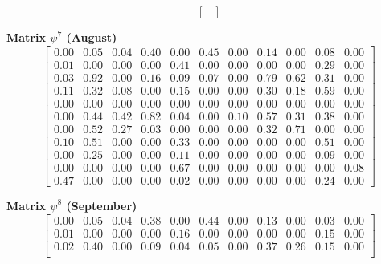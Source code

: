 \documentclass[a4paper,fleqn]{cas-dc}
\begin{document}
\begin{scriptsize}
\[\begin{bmatrix}
\end{bmatrix}
\]

\textbf{Matrix $\psi^{7}$ (August)}
\[
\begin{bmatrix}

0.00 & 0.05 & 0.04 & 0.40 & 0.00 & 0.45 & 0.00 & 0.14 & 0.00 & 0.08 & 0.00\\

0.01 & 0.00 & 0.00 & 0.00 & 0.41 & 0.00 & 0.00 & 0.00 & 0.00 & 0.29 & 0.00\\

0.03 & 0.92 & 0.00 & 0.16 & 0.09 & 0.07 & 0.00 & 0.79 & 0.62 & 0.31 & 0.00\\

0.11 & 0.32 & 0.08 & 0.00 & 0.15 & 0.00 & 0.00 & 0.30 & 0.18 & 0.59 & 0.00\\

0.00 & 0.00 & 0.00 & 0.00 & 0.00 & 0.00 & 0.00 & 0.00 & 0.00 & 0.00 & 0.00\\

0.00 & 0.44 & 0.42 & 0.82 & 0.04 & 0.00 & 0.10 & 0.57 & 0.31 & 0.38 & 0.00\\

0.00 & 0.52 & 0.27 & 0.03 & 0.00 & 0.00 & 0.00 & 0.32 & 0.71 & 0.00 & 0.00\\

0.10 & 0.51 & 0.00 & 0.00 & 0.33 & 0.00 & 0.00 & 0.00 & 0.00 & 0.51 & 0.00\\

0.00 & 0.25 & 0.00 & 0.00 & 0.11 & 0.00 & 0.00 & 0.00 & 0.00 & 0.09 & 0.00\\

0.00 & 0.00 & 0.00 & 0.00 & 0.67 & 0.00 & 0.00 & 0.00 & 0.00 & 0.00 & 0.08\\

0.47 & 0.00 & 0.00 & 0.00 & 0.02 & 0.00 & 0.00 & 0.00 & 0.00 & 0.24 & 0.00

\end{bmatrix}
\]

\textbf{Matrix $\psi^{8}$ (September)}
\[
\begin{bmatrix}

0.00 & 0.05 & 0.04 & 0.38 & 0.00 & 0.44 & 0.00 & 0.13 & 0.00 & 0.03 & 0.00\\

0.01 & 0.00 & 0.00 & 0.00 & 0.16 & 0.00 & 0.00 & 0.00 & 0.00 & 0.15 & 0.00\\

0.02 & 0.40 & 0.00 & 0.09 & 0.04 & 0.05 & 0.00 & 0.37 & 0.26 & 0.15 & 0.00\\


\end{bmatrix}\]
\end{scriptsize}
\end{document}
